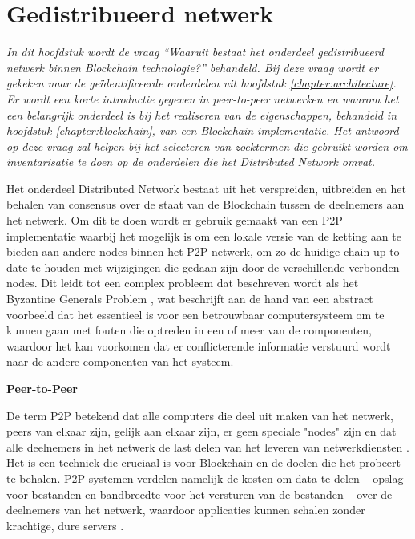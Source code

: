 \section{Gedistribueerd netwerk}

\textit{
  In dit hoofdstuk wordt de vraag ``Waaruit bestaat het onderdeel gedistribueerd netwerk binnen Blockchain technologie?'' behandeld. Bij deze vraag wordt er gekeken naar de geïdentificeerde onderdelen uit hoofdstuk \ref{chapter:architecture}. Er wordt een korte introductie gegeven in peer-to-peer netwerken en waarom het een belangrijk onderdeel is bij het realiseren van de eigenschappen, behandeld in hoofdstuk \ref{chapter:blockchain}, van een Blockchain implementatie. Het antwoord op deze vraag zal helpen bij het selecteren van zoektermen die gebruikt worden om inventarisatie te doen op de onderdelen die het Distributed Network omvat.
}

Het onderdeel Distributed Network bestaat uit het verspreiden, uitbreiden en het behalen van consensus over de staat van de Blockchain tussen de deelnemers aan het netwerk. Om dit te doen wordt er gebruik gemaakt van een \acrfull{P2P} implementatie waarbij het mogelijk is om een lokale versie van de ketting aan te bieden aan andere nodes binnen het \acrshort{P2P} netwerk, om zo de huidige chain up-to-date te houden met wijzigingen die gedaan zijn door de verschillende verbonden nodes. Dit leidt tot een complex probleem dat beschreven wordt als het Byzantine Generals Problem \citep{lamport1982byzantine}, wat beschrijft aan de hand van een abstract voorbeeld dat het essentieel is voor een betrouwbaar computersysteem om te kunnen gaan met fouten die optreden in een of meer van de componenten, waardoor het kan voorkomen dat er conflicterende informatie verstuurd wordt naar de andere componenten van het systeem.

\textbf{Peer-to-Peer}

De term \acrshort{P2P} betekend dat alle computers die deel uit maken van het netwerk, peers van elkaar zijn, gelijk aan elkaar zijn, er geen speciale "nodes" zijn en dat alle deelnemers in het netwerk de last delen van het leveren van netwerkdiensten \citep[~p.171]{Antonopoulos:2014:MBU:2695500}. Het is een techniek die cruciaal is voor Blockchain en de doelen die het probeert te behalen. \acrshort{P2P} systemen verdelen namelijk de kosten om data te delen – opslag voor bestanden en bandbreedte voor het versturen van de bestanden – over de deelnemers van het netwerk, waardoor applicaties kunnen schalen zonder krachtige, dure servers \citep{bawa2003peer}.

